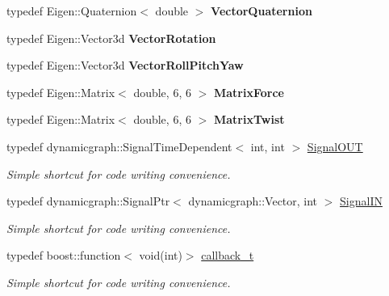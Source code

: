 \begin{DoxyCompactItemize}
typedef Eigen\+::\+Quaternion$<$ double $>$ {\bfseries Vector\+Quaternion}
\item 
\mbox{\label{namespacedynamic__graph_afe3e8341b18b6a3b59f2fa579c2e12c1}} 
typedef Eigen\+::\+Vector3d {\bfseries Vector\+Rotation}
\item 
\mbox{\label{namespacedynamic__graph_af84ad658e1cf7d496958772210dd51b6}} 
typedef Eigen\+::\+Vector3d {\bfseries Vector\+Roll\+Pitch\+Yaw}
\item 
\mbox{\label{namespacedynamic__graph_a1ae11b4524182150738a5da5032a94ea}} 
typedef Eigen\+::\+Matrix$<$ double, 6, 6 $>$ {\bfseries Matrix\+Force}
\item 
\mbox{\label{namespacedynamic__graph_a137b22553cdabfd25e49fc057fa301d6}} 
typedef Eigen\+::\+Matrix$<$ double, 6, 6 $>$ {\bfseries Matrix\+Twist}
\item 
\mbox{\label{namespacedynamic__graph_a9d80c350c95e161319d7a6e629ecdc4b}} 
typedef dynamicgraph\+::\+Signal\+Time\+Dependent$<$ int, int $>$ \hyperlink{namespacedynamic__graph_a9d80c350c95e161319d7a6e629ecdc4b}{Signal\+O\+UT}
\begin{DoxyCompactList}\small\item\em Simple shortcut for code writing convenience. \end{DoxyCompactList}\item 
\mbox{\label{namespacedynamic__graph_ae1463c695a6915ea3f9ab4311beb527a}} 
typedef dynamicgraph\+::\+Signal\+Ptr$<$ dynamicgraph\+::\+Vector, int $>$ \hyperlink{namespacedynamic__graph_ae1463c695a6915ea3f9ab4311beb527a}{Signal\+IN}
\begin{DoxyCompactList}\small\item\em Simple shortcut for code writing convenience. \end{DoxyCompactList}\item 
\mbox{\label{namespacedynamic__graph_adf7d40f2a8d1425af80c14f90e58e961}} 
typedef boost\+::function$<$ void(int)$>$ \hyperlink{namespacedynamic__graph_adf7d40f2a8d1425af80c14f90e58e961}{callback\+\_\+t}
\begin{DoxyCompactList}\small\item\em Simple shortcut for code writing convenience. \end{DoxyCompactList}\item 

\end{DoxyCompactItemize}
